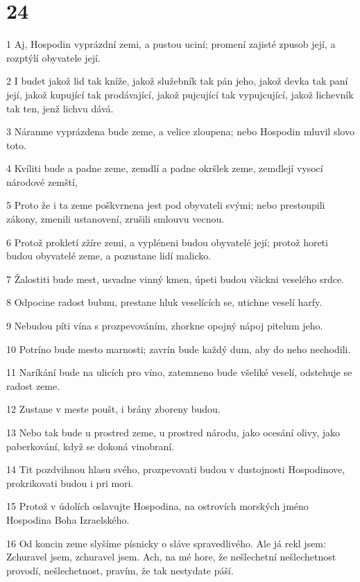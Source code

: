 \chapter{24}

\par 1 Aj, Hospodin vyprázdní zemi, a pustou uciní; promení zajisté zpusob její, a rozptýlí obyvatele její.
\par 2 I budet jakož lid tak kníže, jakož služebník tak pán jeho, jakož devka tak paní její, jakož kupující tak prodávající, jakož pujcující tak vypujcující, jakož lichevník tak ten, jenž lichvu dává.
\par 3 Náramne vyprázdena bude zeme, a velice zloupena; nebo Hospodin mluvil slovo toto.
\par 4 Kvíliti bude a padne zeme, zemdlí a padne okršlek zeme, zemdlejí vysocí národové zemští,
\par 5 Proto že i ta zeme poškvrnena jest pod obyvateli svými; nebo prestoupili zákony, zmenili ustanovení, zrušili smlouvu vecnou.
\par 6 Protož prokletí zžíre zemi, a vypléneni budou obyvatelé její; protož horeti budou obyvatelé zeme, a pozustane lidí malicko.
\par 7 Žalostiti bude mest, usvadne vinný kmen, úpeti budou všickni veselého srdce.
\par 8 Odpocine radost bubnu, prestane hluk veselících se, utichne veselí harfy.
\par 9 Nebudou píti vína s prozpevováním, zhorkne opojný nápoj pitelum jeho.
\par 10 Potríno bude mesto marnosti; zavrín bude každý dum, aby do neho nechodili.
\par 11 Naríkání bude na ulicích pro víno, zatemneno bude všeliké veselí, odstehuje se radost zeme.
\par 12 Zustane v meste poušt, i brány zboreny budou.
\par 13 Nebo tak bude u prostred zeme, u prostred národu, jako ocesání olivy, jako paberkování, když se dokoná vinobraní.
\par 14 Tit pozdvihnou hlasu svého, prozpevovati budou v dustojnosti Hospodinove, prokrikovati budou i pri mori.
\par 15 Protož v údolích oslavujte Hospodina, na ostrovích morských jméno Hospodina Boha Izraelského.
\par 16 Od koncin zeme slyšíme písnicky o sláve spravedlivého. Ale já rekl jsem: Zchuravel jsem, zchuravel jsem. Ach, na mé hore, že nešlechetní nešlechetnost provodí, nešlechetnost, pravím, že tak nestydate páší.
